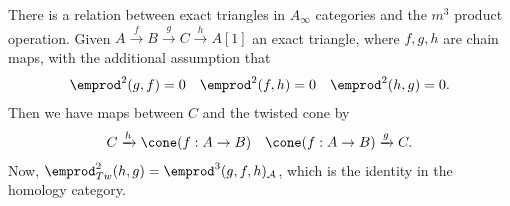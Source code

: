 
 
 

There is a relation between exact triangles in $A_\infty$ categories and the $m^3$ product operation. Given $A\xrightarrow{f}B \xrightarrow{g}C\xrightarrow{h}A[1]$ an exact triangle, where $f, g, h$ are chain maps, with the additional assumption that 
\begin{align*}
    \emprod^2(g, f)=0&& \emprod^2(f, h)=0 && \emprod^2(h, g)=0.
\end{align*}
Then we have  maps between $C$ and the twisted cone by 
\begin{align*}
    C\xrightarrow{h} \cone(f:A\to B)&& \cone(f:A\to B) \xrightarrow{g} C.
\end{align*} 
Now, $\emprod^2_{Tw}(h, g)=\emprod^3(g,f,h)_{\mathcal A}$, which is the identity in the homology category. 
 